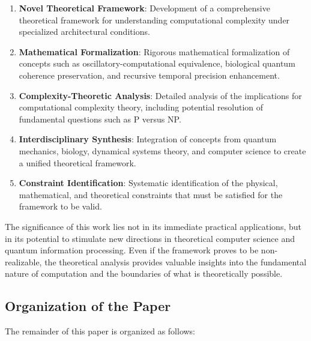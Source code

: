 \documentclass[12pt,a4paper]{article}
\theoremstyle{definition}
\begin{document}
\begin{enumerate}
\item \textbf{Novel Theoretical Framework}: Development of a comprehensive theoretical framework for understanding computational complexity under specialized architectural conditions.

\item \textbf{Mathematical Formalization}: Rigorous mathematical formalization of concepts such as oscillatory-computational equivalence, biological quantum coherence preservation, and recursive temporal precision enhancement.

\item \textbf{Complexity-Theoretic Analysis}: Detailed analysis of the implications for computational complexity theory, including potential resolution of fundamental questions such as P versus NP.

\item \textbf{Interdisciplinary Synthesis}: Integration of concepts from quantum mechanics, biology, dynamical systems theory, and computer science to create a unified theoretical framework.

\item \textbf{Constraint Identification}: Systematic identification of the physical, mathematical, and theoretical constraints that must be satisfied for the framework to be valid.
\end{enumerate}

The significance of this work lies not in its immediate practical applications, but in its potential to stimulate new directions in theoretical computer science and quantum information processing. Even if the framework proves to be non-realizable, the theoretical analysis provides valuable insights into the fundamental nature of computation and the boundaries of what is theoretically possible.

\subsection{Organization of the Paper}

The remainder of this paper is organized as follows:
\end{document}
